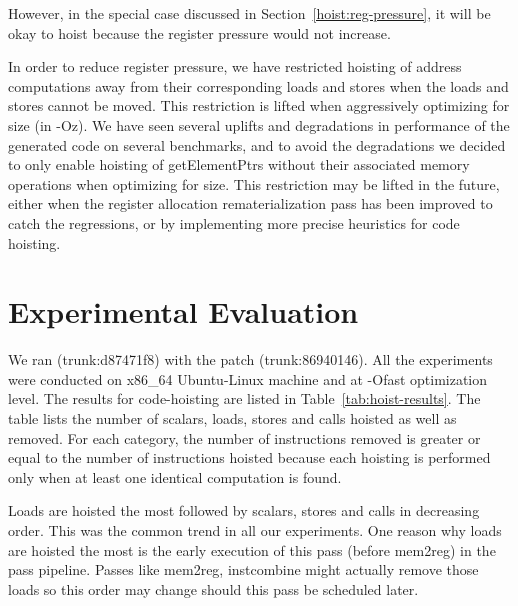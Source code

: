 \documentclass{sig-alternate}
\begin{document}
However, in the special case discussed in Section~\ref{hoist:reg-pressure}, it
will be okay to hoist because the register pressure would not increase.

In order to reduce register pressure, we have restricted hoisting of address
computations away from their corresponding loads and stores when the loads and
stores cannot be moved.  This restriction is lifted when aggressively optimizing
for size (in -Oz).  We have seen several uplifts and degradations in performance
of the generated code on several benchmarks, and to avoid the degradations we
decided to only enable hoisting of getElementPtrs without their associated
memory operations when optimizing for size.  This restriction may be lifted in
the future, either when the register allocation rematerialization pass has been
improved to catch the regressions, or by implementing more precise heuristics
for code hoisting.

\section{Experimental Evaluation}
\label{sec:experimental-results}
We ran \LLVMTestSuite{} (trunk:d87471f8) with the patch (trunk:86940146). All
the experiments were conducted on x86\_64 Ubuntu-Linux machine and at -Ofast
optimization level.  The results for code-hoisting are listed in
Table~\ref{tab:hoist-results}. The table lists the number of scalars, loads,
stores and calls hoisted as well as removed. For each category, the number of
instructions removed is greater or equal to the number of instructions hoisted
because each hoisting is performed only when at least one identical computation
is found.

Loads are hoisted the most followed by scalars, stores and calls in decreasing
order.  This was the common trend in all our experiments. One reason why loads
are hoisted the most is the early execution of this pass (before mem2reg) in the
\LLVM{} pass pipeline. Passes like mem2reg, instcombine might actually remove
those loads so this order may change should this pass be scheduled later.
\end{document}

